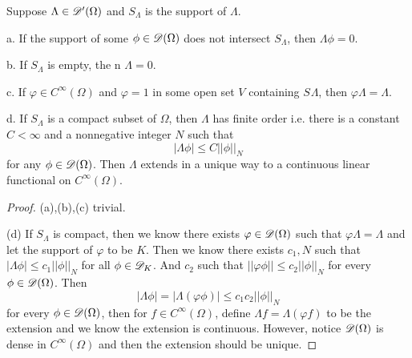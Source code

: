 \begin{theorem}
    Suppose $\Lambda \in \mathscr{D}'(\Omega)$ and $S_{\Lambda}$ is the support of $\Lambda$.\par
    a. If the support of some $\phi \in \mathscr{D}(\Omega)$ does not intersect $S_{\Lambda}$, then $\Lambda \phi = 0$.\par
    b. If $S_{\Lambda}$ is empty, the n $\Lambda = 0$.\par
    c. If $\varphi \in C^{\infty}(\Omega)$ and $\varphi = 1$ in some open set $V$ containing $S_{}\Lambda$, then $\varphi \Lambda = \Lambda$.\par
    d. If $S_{\Lambda}$ is a compact subset of $\Omega$, then $\Lambda$ has finite order i.e. there is a constant $C < \infty$ and a nonnegative integer $N$ such that
    \[
    |\Lambda \phi| \leq C||\phi||_N
    \]
    for any $\phi \in \mathscr{D}(\Omega)$. Then $\Lambda$ extends in a unique way to a continuous linear functional on $C^{\infty}(\Omega)$.
\end{theorem}
\begin{proof}
    (a),(b),(c) trivial.\par
    (d) If $S_{\Lambda}$ is compact, then we know there exists $\varphi \in \mathscr{D}(\Omega)$ such that $\varphi\Lambda = \Lambda$ and let the support of $\varphi$ to be $K$. Then we know there exists $c_1,N$ such that $|\Lambda \phi| \leq c_1||\phi||_N$ for all $\phi \in \mathscr{D}_K$. And $c_2$ such that $||\varphi\phi|| \leq c_2||\phi||_N$ for every $\phi \in \mathscr{D}(\Omega)$. Then
    \[
    |\Lambda \phi| = |\Lambda(\varphi\phi)| \leq c_1c_2||\phi||_N
    \]
    for every $\phi \in \mathscr{D}(\Omega)$, then for $f\in C^{\infty}(\Omega)$, define $\Lambda f = \Lambda(\varphi f)$ to be the extension and we know the extension is continuous. However, notice $\mathscr{D}(\Omega)$ is dense in $C^{\infty}(\Omega)$ and then the extension should be unique.
\end{proof}

